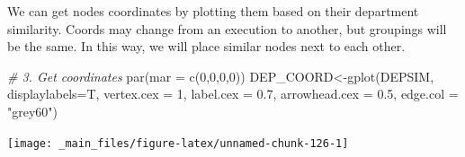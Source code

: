 \documentclass[
  notitlepage,
  onecolumn,
  openany]{book}
\newenvironment{Shaded}{\begin{snugshade}}{\end{snugshade}}
\newcommand{\AttributeTok}[1]{\textcolor[rgb]{0.77,0.63,0.00}{#1}}
\newcommand{\CommentTok}[1]{\textcolor[rgb]{0.56,0.35,0.01}{\textit{#1}}}
\newcommand{\ConstantTok}[1]{\textcolor[rgb]{0.00,0.00,0.00}{#1}}
\newcommand{\DecValTok}[1]{\textcolor[rgb]{0.00,0.00,0.81}{#1}}
\newcommand{\FloatTok}[1]{\textcolor[rgb]{0.00,0.00,0.81}{#1}}
\newcommand{\FunctionTok}[1]{\textcolor[rgb]{0.00,0.00,0.00}{#1}}
\newcommand{\NormalTok}[1]{#1}
\newcommand{\OtherTok}[1]{\textcolor[rgb]{0.56,0.35,0.01}{#1}}
\newcommand{\SpecialCharTok}[1]{\textcolor[rgb]{0.00,0.00,0.00}{#1}}
\newcommand{\StringTok}[1]{\textcolor[rgb]{0.31,0.60,0.02}{#1}}
\begin{document}
\begin{Shaded}
\end{Shaded}

We can get nodes coordinates by plotting them based on their department similarity. Coords may change from an execution to another, but groupings will be the same. In this way, we will place similar nodes next to each other.

\begin{Shaded}
\begin{Highlighting}[]
\CommentTok{\# 3. Get coordinates}
\FunctionTok{par}\NormalTok{(}\AttributeTok{mar =} \FunctionTok{c}\NormalTok{(}\DecValTok{0}\NormalTok{,}\DecValTok{0}\NormalTok{,}\DecValTok{0}\NormalTok{,}\DecValTok{0}\NormalTok{))}
\NormalTok{DEP\_COORD}\OtherTok{\textless{}{-}}\FunctionTok{gplot}\NormalTok{(DEPSIM, }
                 \AttributeTok{displaylabels=}\NormalTok{T,}
                 \AttributeTok{vertex.cex =} \DecValTok{1}\NormalTok{,}
                 \AttributeTok{label.cex =} \FloatTok{0.7}\NormalTok{,}
                 \AttributeTok{arrowhead.cex =} \FloatTok{0.5}\NormalTok{,}
                 \AttributeTok{edge.col =} \StringTok{"grey60"}\NormalTok{)}
\end{Highlighting}
\end{Shaded}

\begin{center}\texttt{[image: \_main\_files/figure-latex/unnamed-chunk-126-1]} \end{center}
\end{document}
